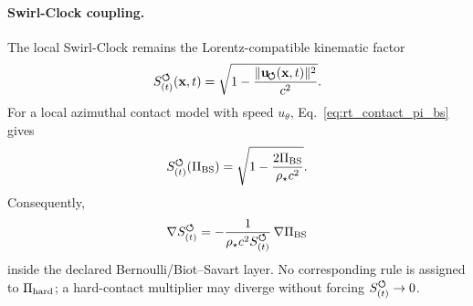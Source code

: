 \paragraph{Swirl-Clock coupling.}
The local Swirl-Clock remains the Lorentz-compatible kinematic factor
\begin{equation}
    S_{(t)}^{\boldsymbol{\circlearrowleft}}(\mathbf x,t)
    =
    \sqrt{
        1-
        \frac{\lVert\mathbf{u}_{\!\boldsymbol{\circlearrowleft}}(\mathbf x,t)\rVert^2}{c^2}
    } .
    \label{eq:rt_contact_swirl_clock_kinematic}
\end{equation}
For a local azimuthal contact model with speed \(u_\theta\),
Eq.~\eqref{eq:rt_contact_pi_bs} gives
\begin{equation}
    S_{(t)}^{\boldsymbol{\circlearrowleft}}(\Pi_{\rm BS})
    =
    \sqrt{
        1-
        \frac{2\Pi_{\rm BS}}{\rho_\star c^2}
    } .
    \label{eq:rt_contact_swirl_clock_pressure}
\end{equation}
Consequently,
\begin{equation}
    \nabla S_{(t)}^{\boldsymbol{\circlearrowleft}}
    =
    -\frac{1}{\rho_\star c^2S_{(t)}^{\boldsymbol{\circlearrowleft}}}\,
    \nabla\Pi_{\rm BS}
    \label{eq:rt_contact_swirl_clock_gradient_pressure}
\end{equation}
inside the declared Bernoulli/Biot--Savart layer.  No corresponding rule is
assigned to \(\Pi_{\rm hard}\); a hard-contact multiplier may diverge without
forcing \(S_{(t)}^{\boldsymbol{\circlearrowleft}}\to0\).

